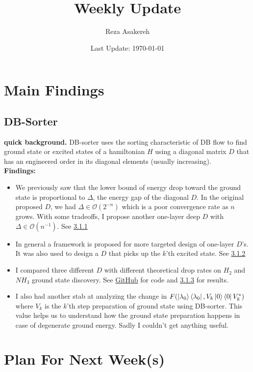 \documentclass[11pt]{article}
\title{Weekly Update}
\author{Reza Asakereh}
\date{Last Update: \today}
\begin{document}
\maketitle

\section{Main Findings}
\subsection{DB-Sorter}
\textbf{quick background.} DB-sorter uses the sorting characteristic of DB flow to find ground state or excited states of a hamiltonian $H$ using a diagonal matrix $D$ that has an engineered order in its diagonal elements (usually increasing).
\\

\textbf{Findings:}
\begin{itemize}
    \item We previously saw that the lower bound of energy drop toward the ground state is proportional to $\Delta$, the energy gap of the diagonal $D$. In the original proposed $D$, we had $\Delta \in \mathcal{O}(2^{-n})$ which is a poor convergence rate as $n$ grows. With some tradeoffs, I propose another one-layer deep $D$ with $\Delta \in \mathcal{O}(n^{-1})$. See \hyperref[sec:homographic-D]{3.1.1}
    \item In general a framework is proposed for more targeted design of one-layer $D$'s. It was also used to design a $D$ that picks up the $k$'th excited state. See \hyperref[sec:design-D]{3.1.2}
    \item I compared three different $D$ with different theoretical drop rates on $H_2$ and $NH_3$ ground state discovery. See \href{https://github.com/rasakereh/double-bracket-algo/blob/master/examples/different_diagonals.py}{GitHub} for code and \hyperref[sec:D-comparison]{3.1.3} for results.
    \item I also had another stab at analyzing the change in $F(\ket{\lambda_0}\bra{\lambda_0}, V_k\ket{0}\bra{0}V_k^*)$ where $V_k$ is the $k$'th step preparation of ground state using DB-sorter. This value helps us to understand how the ground state preparation happens in case of degenerate ground energy. Sadly I couldn't get anything useful.
\end{itemize}


\section{Plan For Next Week(s)}
\end{document}
